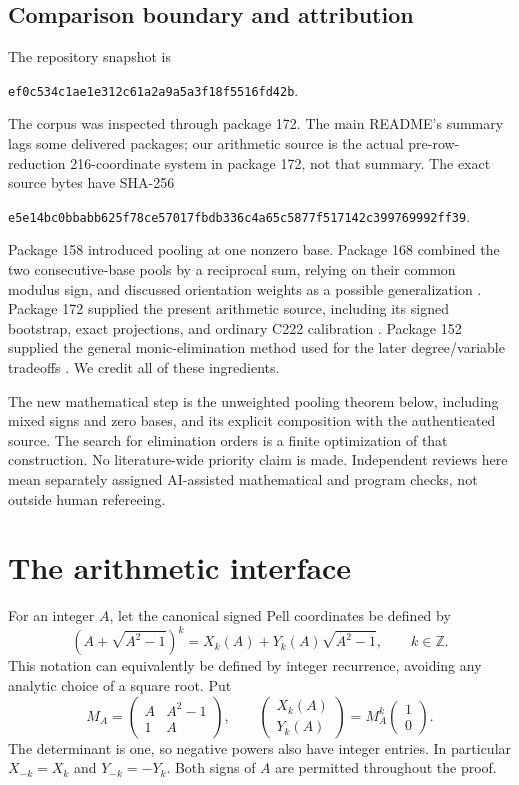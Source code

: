 \documentclass[10pt,letterpaper]{article}
\theoremstyle{remark}\newtheorem{remark}[theorem]{Remark}
\newcommand{\Z}{\mathbb Z}\newcommand{\Q}{\mathbb Q}\newcommand{\N}{\mathbb N}
\begin{document}
\subsection{Comparison boundary and attribution}

The repository snapshot is
\begin{center}\small\texttt{ef0c534c1ae1e312c61a2a9a5a3f18f5516fd42b}.\end{center}
The corpus was inspected through package 172. The main README's summary
lags some delivered packages; our arithmetic source is the actual
pre-row-reduction 216-coordinate system in package 172, not that summary.
The exact source bytes have SHA-256
\begin{center}\scriptsize\texttt{e5e14bc0bbabb625f78ce57017fbdb336c4a65c5877f517142c399769992ff39}.\end{center}

Package 158 introduced pooling at one nonzero base. Package 168 combined
the two consecutive-base pools by a reciprocal sum, relying on their
common modulus sign, and discussed orientation weights as a possible
generalization \cite{pool158,pool168}. Package 172 supplied the present
arithmetic source, including its signed bootstrap, exact projections,
and ordinary C222 calibration \cite{source172}. Package 152 supplied the
general monic-elimination method used for the later degree/variable
tradeoffs \cite{eliminate152}. We credit all of these ingredients.

The new mathematical step is the unweighted pooling theorem below,
including mixed signs and zero bases, and its explicit composition with
the authenticated source. The search for elimination orders is a finite
optimization of that construction. No literature-wide priority claim is
made. Independent reviews here mean separately assigned AI-assisted
mathematical and program checks, not outside human refereeing.

\section{The arithmetic interface}

For an integer $A$, let the canonical signed Pell coordinates be defined
by
\[
 (A+\sqrt{A^2-1})^k=X_k(A)+Y_k(A)\sqrt{A^2-1},\qquad k\in\Z.
\]
This notation can equivalently be defined by integer recurrence, avoiding
any analytic choice of a square root. Put
\[
 M_A=\begin{pmatrix}A&A^2-1\\1&A\end{pmatrix},\qquad
 \begin{pmatrix}X_k(A)\\Y_k(A)\end{pmatrix}
 =M_A^k\begin{pmatrix}1\\0\end{pmatrix}.
\]
The determinant is one, so negative powers also have integer entries.
In particular $X_{-k}=X_k$ and $Y_{-k}=-Y_k$. Both signs of $A$ are
permitted throughout the proof.
\end{document}
